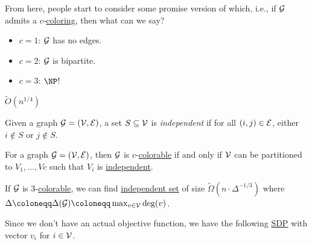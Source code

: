 From here, people start to consider some promise version of which, i.e., if \(\mathcal{\MakeUppercase{g}} \) admits a \(c\)-\hyperref[def:coloring]{coloring}, then what can we say?
\begin{itemize}
	\item \(c = 1\): \(\mathcal{\MakeUppercase{g}} \) has no edges.
	\item \(c = 2\): \(\mathcal{\MakeUppercase{g}} \) is bipartite.
	\item \(c = 3\): \(\NP\)!
\end{itemize}

\(\widetilde{O} (n^{1 / 4})\)

\begin{definition}\label{def:independent-set}
	Given a graph \(\mathcal{\MakeUppercase{g}} =(\mathcal{\MakeUppercase{v}} , \mathcal{\MakeUppercase{e}} )\), a set \(S \subseteq \mathcal{\MakeUppercase{v}} \) is \emph{independent} if for all \((i, j)\in \mathcal{\MakeUppercase{e}} \), either \(i \notin S\) or \(j \notin S\).
\end{definition}

\begin{lemma}
	For a graph \(\mathcal{\MakeUppercase{g}} =(\mathcal{\MakeUppercase{v}} , \mathcal{\MakeUppercase{e}} )\), then \(\mathcal{\MakeUppercase{g}} \) is \(c\)-\hyperref[def:coloring]{colorable} if and only if \(\mathcal{\MakeUppercase{v}} \) can be partitioned to \(V_1, \ldots, Vc\) such that \(V_i\) is \hyperref[def:independent-set]{independent}.
\end{lemma}

\begin{theorem}
	If \(\mathcal{\MakeUppercase{g}} \) is \(3\)-\hyperref[def:coloring]{colorable}, we can find \hyperref[def:independent-set]{independent set} of size \(\widetilde{\Omega} (n\cdot \Delta ^{-1 / 3})\) where \(\Delta \coloneqq \Delta (\mathcal{\MakeUppercase{G}} )\coloneqq \max_{v\in \mathcal{\MakeUppercase{v}} } \deg(v)\).
\end{theorem}

Since we don't have an actual objective function, we have the following \hyperref[def:SDP]{SDP} with vector \(v_i\) for \(i\in \mathcal{\MakeUppercase{v}} \).

